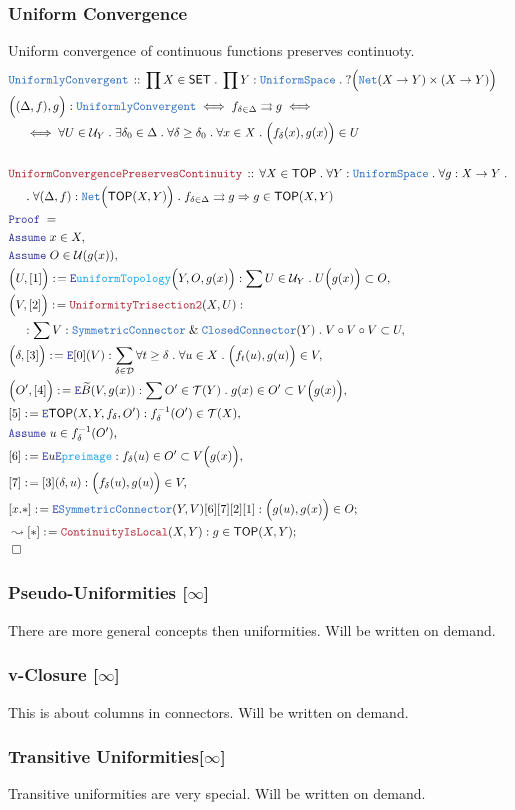 \documentclass[12pt]{scrartcl}
\newcommand{\TYPE}[1]{\textcolor{NavyBlue}{\mathtt{#1}}}
\newcommand{\FUNC}[1]{\textcolor{Cerulean}{\mathtt{#1}}}
\newcommand{\LOGIC}[1]{\textcolor{Blue}{\mathtt{#1}}}
\newcommand{\THM}[1]{\textcolor{Maroon}{\mathtt{#1}}}
\renewcommand{\.}{\; . \;}
\newcommand{\de}{: \kern 0.1pc =}
\newcommand{\Theorem}[2]{& \THM{#1} \, :: \, #2 \\ & \Proof = \\ }
\newcommand{\DeclareType}[2]{& \TYPE{#1} \, :: \, #2 \\}
\newcommand{\DefineNamedType}[4]{& #1 : \TYPE{#2} \iff #3 \iff #4 \\}
\newcommand{\NewLine}{\\ & \kern 1pc}
\newcommand{\Page}[1]{ \begin{align*} #1 \end{align*}   }
\renewcommand{\And}{\; \& \;}
\newcommand{\Imply}{\Rightarrow}
\newcommand{\Say}[3]{& #1 \de #2 : #3, \\}
\newcommand{\Conclude}[3]{& #1 \de #2 : #3; \\}
\newcommand{\DeriveConclude}[3]{& \leadsto #1 \de #2 : #3 ; \\}
\newcommand{\AssumeIn}[2]{& \LOGIC{Assume} \; #1 \in #2, \\}
\newcommand{\Elim}{\LOGIC{E}}
\newcommand{\QED}{\; \square}
\newcommand{\EndProof}{& \QED \\}
\newcommand{\Proof}{\LOGIC{Proof} \; }
\newcommand{\D}{\mathcal{D}}
\newcommand{\SET}{\mathsf{SET}}
\newcommand{\Net}{\TYPE{Net}}
\newcommand{\TOP}{\mathsf{TOP}}
\newcommand{\T}{\mathcal{T}}
\renewcommand{\U}{\mathcal{U}}
\newcommand{\CConnector}{\TYPE{ClosedConnector}}
\newcommand{\US}{\TYPE{UniformSpace}}
\newcommand{\Sym}{\TYPE{SymmetricConnector}}
\begin{document}
\subsubsection{Uniform Convergence}
Uniform convergence of continuous functions preserves continuoty.
\Page{
	\DeclareType{UniformlyConvergent}
	{
		\prod X \in \SET \.
		\prod Y : \US \.
		? \Big(\Net(X \to Y) \times (X \to Y)\Big)
	}
	\DefineNamedType{\Big((\Delta,f),g\Big)}{UniformlyConvergent}
	{f_{\delta \in \Delta} \rightrightarrows g }
	{
		\NewLine \iff		
		\forall U \in \U_Y \. 
		\exists \delta_0 \in \Delta \.
		\forall \delta \ge \delta_0 \.
		\forall x \in X \. 
		\Big(f_\delta(x),g(x)\Big) \in U
	}
	\\
	\Theorem{UniformConvergencePreservesContinuity}
	{
		\forall X \in \TOP \.
		\forall Y : \US \.
		\forall g : X \to Y \. \NewLine \.
		\forall (\Delta,f) : \Net\Big( \TOP(X,Y)\Big) \.
		f_{\delta \in \Delta} \rightrightarrows g
		\Imply
		g \in \TOP(X,Y)
	}
	\AssumeIn{x}{X}
	\AssumeIn{O}{\U(g(x))}
	\Say{\Big(U,[1]\Big)}{\Elim \FUNC{uniformTopology}\Big(Y,O,g(x)\Big)  }
	{
		\sum U \in \U_Y \.  U\Big( g(x) \Big) \subset O
	}
	\Say{\Big(V, [2] \Big)}
	{
			\THM{UniformityTrisection2}(X,U)	
	}
	{
		\NewLine :		
		\sum V : \Sym \And \CConnector(Y) \.
		V \circ V \circ V \subset U
	}
	\Say{\Big(\delta,[3]\Big)}{\Elim [0](V)}
	{
		\sum_{\delta \in \D} \forall t \ge \delta \. 
		\forall u \in X \.		
		 \Big( f_t(u), g(u) \Big) \in V
	}
	\Say{\Big( O', [4] \Big)}{\Elim \widetilde{B}(V,g(x))}
	{
		\sum O' \in \T(Y) \. g(x) \in O' \subset V\Big( g(x) \Big)
	}
	\Say{[5]}{\Elim \TOP(X,Y,f_\delta,O')}
	{
		f_\delta^{-1}(O') \in \T(X)
	}
	\AssumeIn{u}{f_\delta^{-1}(O')}
	\Say{[6]}{\Elim u \Elim \FUNC{preimage}}
	{
		f_\delta(u) \in O' \subset V\Big( g(x) \Big) 	
	}
	\Say{[7]}{[3](\delta,u)}{\Big( f_\delta(u),g(u) \Big) \in V}
	\Conclude{[x.*]}{\Elim \Sym(Y,V)[6][7][2][1]}
	{
		\Big(g(u),g(x)\Big) \in O
	}
	\DeriveConclude{[*]}
	{
		\THM{ContinuityIsLocal}(X,Y)
	}
	{
		g \in \TOP(X,Y)
	}
	\EndProof
}
\newpage
\subsubsection{Pseudo-Uniformities [$\infty$]}
There are more general concepts then uniformities.
Will be written on demand.
\subsubsection{v-Closure [$\infty$]}
This is about columns in connectors.
Will be written on demand.
\subsubsection{Transitive Uniformities[$\infty$]}
Transitive uniformities are very special.
Will be written on demand.
\newpage
\end{document}
